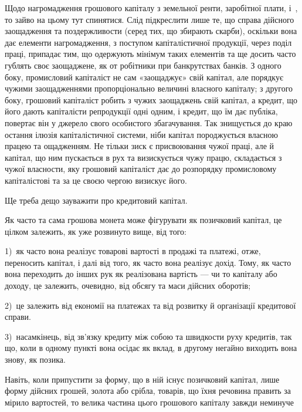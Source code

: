 Щодо нагромадження грошового капіталу з земельної ренти, заробітної плати,
і~, то зайво на цьому тут спинятися. Слід підкреслити лише те, що справа
дійсного заощадження та поздержливости (серед тих, що збирають скарби), оскільки
вона дає елементи нагромадження, з поступом капіталістичної продукції, через поділ
праці, припадає тим, що одержують мінімум таких елементів та ще досить часто
гублять своє заощаджене, як от робітники при банкрутствах банків. З одного
боку, промисловий капіталіст не сам «заощаджує» свій капітал, але порядкує чужими
заощадженнями пропорціонально величині власного капіталу; з другого боку,
грошовий капіталіст робить з чужих заощаджень свій капітал, а кредит, що його
дають капіталісти репродукції одні одним, і кредит, що їм дає публіка, повертає
він у джерело свого особистого збагачування. Так знищується до краю остання
ілюзія капіталістичної системи, ніби капітал породжується власною працею та ощадженням.
Не тільки зиск є присвоювання чужої праці, але й капітал, що ним
пускається в рух та визискується чужу працю, складається з чужої власности,
яку грошовий капіталіст дає до розпорядку промисловому капіталістові та за
це своєю чергою визискує його.

Ще треба дещо зауважити про кредитовий капітал.

Як часто та сама грошова монета може фігурувати як позичковий капітал,
це цілком залежить, як уже розвинуто вище, від того:

1)~як часто вона реалізує товарові вартості в продажі та платежі, отже,
переносить капітал, і далі від того, як часто вона реалізує дохід. Тому, як
часто вона переходить до інших рук як реалізована вартість — чи то капіталу
або доходу, це залежить, очевидно, від обсягу та маси дійсних оборотів;

2)~це залежить від економії на платежах та від розвитку й організації
кредитової справи.

3)~насамкінець, від зв’язку кредиту між собою та швидкости руху кредитів,
так що, коли в одному пункті вона осідає як вклад, в другому негайно
виходить вона знову, як позика.

Навіть, коли припустити за форму, що в ній існує позичковий капітал, лише
форму дійсних грошей, золота або срібла, товарів, що їхня речовина править за
мірило вартостей, то велика частина цього грошового капіталу завжди неминуче
\parbreak{}  %
